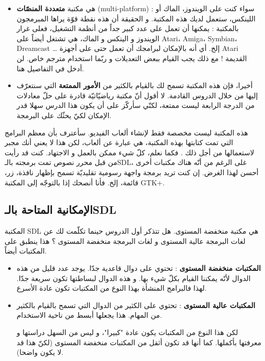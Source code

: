 \begin{itemize}
 	\item هي مكتبة
 	\textbf{متعددة المنصّات} 
 	(\textenglish{multi-platform}) :
 	سواء كنت على الويندوز، الماك أو اللينكس، ستعمل لديك هذه المكتبة. و الحقيقة أن هذه نقطة قوّة يراها المبرمجون بالمكتبة : يمكنها أن تعمل على عدد كبير جداً من أنظمة التشغيل، فعلى غرار الويندوز و الينكس و الماك، هي تشتغل أيضاً على 
 	\textenglish{Atari}، \textenglish{Amiga}، \textenglish{Symbian}، \textenglish{Dreamcast} \dots
 	إلخ. أي أنه بالإمكان لبرامجك أن تعمل حتى على أجهزة 
 	\textenglish{Atari}
 	القديمة ! مع ذلك يجب القيام ببعض التعديلات و ربّما استخدام مترجم خاص. لن أدخل في التفاصيل هنا.
 	\item أخيرا، فإن هذه المكتبة تسمح لك بالقيام بالكثير من 
 	\textbf{الأمور الممتعة}
 	التي سنتعرّف إليها من خلال الدروس القادمة. لا أقول أنّ مكتبة رياضيّاتيّة قادرة على حلّ معادلات من الدرجة الرابعة ليست ممتعة، لكنّي سأركّز على أن يكون هذا الدرس سهلا قدر الإمكان لكيّ يحثّك على البرمجة.
\end{itemize}

هذه المكتبة ليست مخصصة فقط لإنشاء ألعاب الفيديو. سأعترف بأن معظم البرامج التي تمت كتابتها بهذه المكتبة، هي عبارة عن ألعاب، لكن هذا لا يعني أنك مجبر لاستعمالها من أجل ذلك . فكما نعلم، كلّ شيء ممكن بالعمل و الاجتهاد. كنت قد رأيت من قبل محرر نصوص تمت برمجته بالـ\textenglish{SDL}،
غلى الرغم من أنّه هناك مكتبات أخرى أحسن لهذا الغرض. إن كنت تريد برمجة واجهة رسومية تقليديّة تسمح بإظهار نافذة، زر، قائمة، إلخ. فأنا أنصحك إذا بالتوجّه إلى المكتبة 
\textenglish{GTK+}.

\subsection{الإمكانية المتاحة بالـ\textenglish{SDL}}

المكتبة
\textenglish{SDL}
هي مكتبة منخفضة المستوى. هل تتذكر أول الدروس حينما تكلّمت لك عن لغات البرمجة عالية المستوى و لغات البرمجة منخفضة المستوى ؟ هذا ينطبق على المكتبات أيضاً.

\begin{itemize}
	\item \textbf{المكتبات منخفضة المستوى} : 
	تحتوي على دوال قاعدية جدّا. يوجد عدد قليل من هذه الدوال لأنّه يمكننا القيام بكلّ شيء بها. و هذه الدوال لبساطتها تكون سريعة جدّا. لهذا فالبرامج المنشأة بهذا النوع من المكتبات تكون عادة الأسرع.
	\item \textbf{المكتبات عالية المستوى} : 
	تحتوي على الكثير من الدوال التي تسمح بالقيام بالكثير من المهام. هذا يجعلها أبسط من ناحية الاستخدام.
	
	لكن هذا النوع من المكتبات يكون عادة "كبيرا"، و ليس من السهل دراستها و معرفتها بأكملها. كما أنها قد تكون أثقل من المكتبات منخفضة المستوى (لكنّ هذا قد لا يكون واضحا).
\end{itemize}

